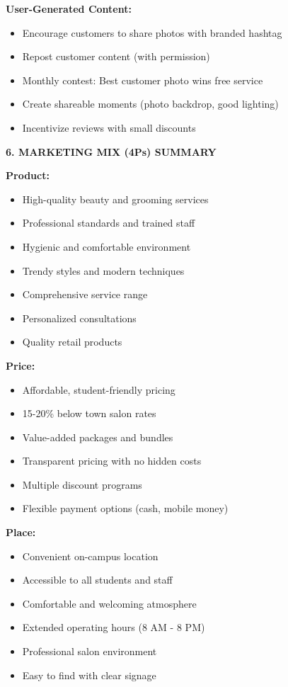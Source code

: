 \textbf{User-Generated Content:}
\begin{itemize}[leftmargin=2em]
    \item Encourage customers to share photos with branded hashtag
    \item Repost customer content (with permission)
    \item Monthly contest: Best customer photo wins free service
    \item Create shareable moments (photo backdrop, good lighting)
    \item Incentivize reviews with small discounts
\end{itemize}

\vspace{1em}

\textbf{6. MARKETING MIX (4Ps) SUMMARY}

\textbf{Product:}
\begin{itemize}[leftmargin=2em]
    \item High-quality beauty and grooming services
    \item Professional standards and trained staff
    \item Hygienic and comfortable environment
    \item Trendy styles and modern techniques
    \item Comprehensive service range
    \item Personalized consultations
    \item Quality retail products
\end{itemize}

\textbf{Price:}
\begin{itemize}[leftmargin=2em]
    \item Affordable, student-friendly pricing
    \item 15-20\% below town salon rates
    \item Value-added packages and bundles
    \item Transparent pricing with no hidden costs
    \item Multiple discount programs
    \item Flexible payment options (cash, mobile money)
\end{itemize}

\textbf{Place:}
\begin{itemize}[leftmargin=2em]
    \item Convenient on-campus location
    \item Accessible to all students and staff
    \item Comfortable and welcoming atmosphere
    \item Extended operating hours (8 AM - 8 PM)
    \item Professional salon environment
    \item Easy to find with clear signage
\end{itemize}

